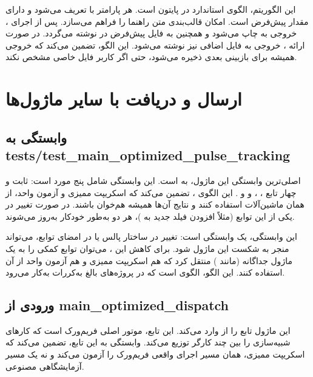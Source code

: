 این الگوریتم، الگوی استاندارد  در پایتون است. هر پارامتر با  تعریف می‌شود و دارای مقدار پیش‌فرض است.  امکان قالب‌بندی متن راهنما را فراهم می‌سازد. پس از اجرای ، خروجی به  چاپ می‌شود و همچنین به فایل پیش‌فرض در  نوشته می‌گردد. در صورت ارائه ، خروجی به فایل اضافی نیز نوشته می‌شود. این الگو، تضمین می‌کند که خروجی همیشه برای بازبینی بعدی ذخیره می‌شود، حتی اگر کاربر فایل خاصی مشخص نکند.

\section{ارسال و دریافت با سایر ماژول‌ها}

\subsection{وابستگی به tests/test\_main\_optimized\_pulse\_tracking}

اصلی‌ترین وابستگی این ماژول، به  است. این وابستگی شامل پنج مورد است: ثابت  و چهار تابع ، ،  و  و . این الگوی ، تضمین می‌کند که اسکریپت ممیزی و آزمون واحد، از همان ماشین‌آلات استفاده کنند و نتایج آن‌ها همیشه هم‌خوان باشند. در صورت تغییر در یکی از این توابع (مثلاً افزودن فیلد جدید به )، هر دو به‌طور خودکار به‌روز می‌شوند.

این وابستگی، یک وابستگی  است: تغییر در ساختار  پالس یا در امضای توابع، می‌تواند منجر به شکست این ماژول شود. برای کاهش این ، می‌توان توابع کمکی را به یک ماژول جداگانه (مانند ) منتقل کرد که هم اسکریپت ممیزی و هم آزمون واحد از آن استفاده کنند. این الگو، الگوی  است که در پروژه‌های بالغ به‌کررات به‌کار می‌رود.

\subsection{ورودی از main\_optimized\_dispatch}

این ماژول تابع  را از  وارد می‌کند. این تابع، موتور اصلی  فریم‌ورک است که کارهای شبیه‌سازی را بین چند کارگر توزیع می‌کند. وابستگی به این تابع، تضمین می‌کند که اسکریپت ممیزی، همان مسیر اجرای واقعی فریم‌ورک را آزمون می‌کند و نه یک مسیر آزمایشگاهی مصنوعی.

